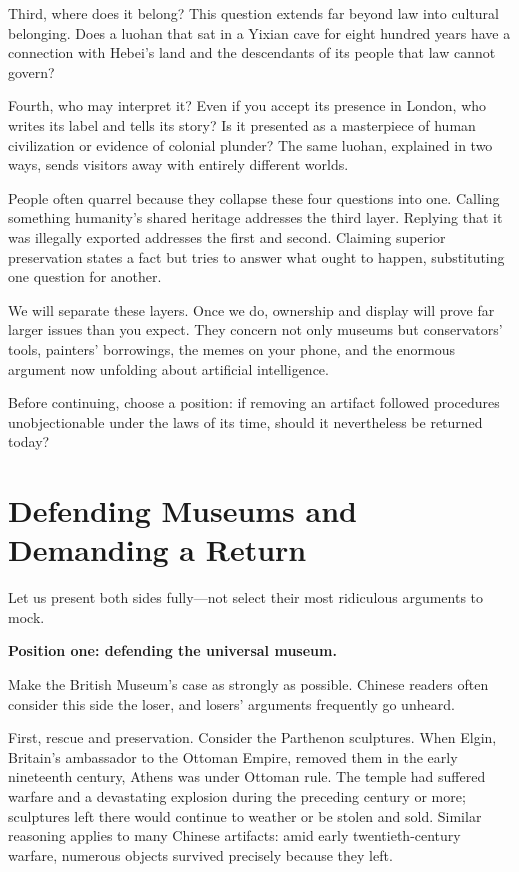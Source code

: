 Third, where does it belong? This question extends far beyond law into cultural belonging. Does a luohan that sat in a Yixian cave for eight hundred years have a connection with Hebei's land and the descendants of its people that law cannot govern?

Fourth, who may interpret it? Even if you accept its presence in London, who writes its label and tells its story? Is it presented as a masterpiece of human civilization or evidence of colonial plunder? The same luohan, explained in two ways, sends visitors away with entirely different worlds.

People often quarrel because they collapse these four questions into one. Calling something humanity's shared heritage addresses the third layer. Replying that it was illegally exported addresses the first and second. Claiming superior preservation states a fact but tries to answer what ought to happen, substituting one question for another.

We will separate these layers. Once we do, ownership and display will prove far larger issues than you expect. They concern not only museums but conservators' tools, painters' borrowings, the memes on your phone, and the enormous argument now unfolding about artificial intelligence.

Before continuing, choose a position: if removing an artifact followed procedures unobjectionable under the laws of its time, should it nevertheless be returned today?

\section{Defending Museums and Demanding a Return}
Let us present both sides fully---not select their most ridiculous arguments to mock.

\textbf{Position one: defending the universal museum.}

Make the British Museum's case as strongly as possible. Chinese readers often consider this side the loser, and losers' arguments frequently go unheard.

First, rescue and preservation. Consider the Parthenon sculptures. When Elgin, Britain's ambassador to the Ottoman Empire, removed them in the early nineteenth century, Athens was under Ottoman rule. The temple had suffered warfare and a devastating explosion during the preceding century or more; sculptures left there would continue to weather or be stolen and sold. Similar reasoning applies to many Chinese artifacts: amid early twentieth-century warfare, numerous objects survived precisely because they left.

